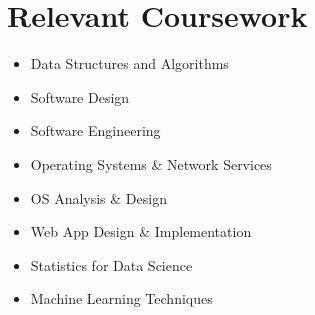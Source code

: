 \documentclass[a4,11pt]{article}
\begin{document}
\section{Relevant Coursework}
    \begin{multicols}{3}
        \begin{itemize}[itemsep=-2pt, parsep=3pt]
            \item\small Data Structures and Algorithms
            \item Software Design
            \item Software Engineering
            \item Operating Systems \& Network Services
            \item OS Analysis \& Design
            \item Web App Design \& Implementation
            \item Statistics for Data Science
            \item Machine Learning Techniques
        \end{itemize}
    \end{multicols}
    \vspace*{2.0\multicolsep}

\end{document}
